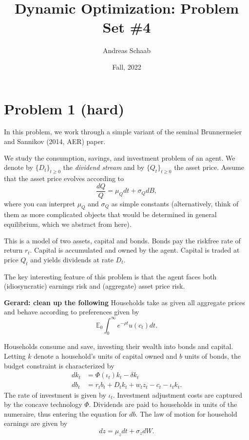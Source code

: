 \documentclass[11pt]{extarticle}
\title{Dynamic Optimization: Problem Set \#4}
\author{Andreas Schaab}
\date{Fall, 2022}
\theoremstyle{plain}
\theoremstyle{definition}
\begin{document}
\maketitle
\thispagestyle{empty}
\setcounter{page}{0}


\vspace{10mm}
\section*{Problem 1 (hard)}

In this problem, we work through a simple variant of the seminal Brunnermeier and Sannikov (2014, AER) paper.

We study the consumption, savings, and investment problem of an agent. We denote by $\{ D_t \}_{t \geq 0}$ the \textit{dividend stream} and by $\{ Q_t \}_{t \geq 0}$ the asset price. Assume that the asset price evolves according to 
\begin{equation*}
	\frac{ dQ }{Q} = \mu_Q dt + \sigma_Q dB,
\end{equation*}
where you can interpret $\mu_Q$ and $\sigma_Q$ as simple constants (alternatively, think of them as more complicated objects that would be determined in general equilibrium, which we abstract from here).


This is a model of two assets, capital and bonds. Bonds pay the riskfree rate of return $r_t$. Capital is accumulated and owned by the agent. Capital is traded at price $Q_t$ and yields dividends at rate $D_t$.


The key interesting feature of this problem is that the agent faces both (idiosyncratic) earnings risk and (aggregate) asset price risk.


\vspace{10mm}
\textbf{Gerard: clean up the following}
Households take as given all aggregate prices and behave according to preferences given by
\begin{equation*}
	\mathbb{E}_0 \int_0^\infty e^{- \rho t} u(c_t) dt.
\end{equation*}

Households consume and save, investing their wealth into bonds and capital. Letting $k$ denote a household's units of capital owned and $b$ units of bonds, the budget constraint is characterized by
\begin{align*}
	dk_t &= \Phi(\iota_t) k_t - \delta k_t \\
	db_t &= r_t b_t + D_t k_t + w_t z_t - c_t -  \iota_t k_t.
\end{align*}
The rate of investment is given by $\iota_t$. Investment adjustment costs are captured by the concave technology $\Phi$. Dividends are paid to households in units of the numeraire, thus entering the equation for $db$. The law of motion for household earnings are given by
\begin{equation*}
	dz = \mu_z dt + \sigma_z dW. 
\end{equation*}
\end{document}
